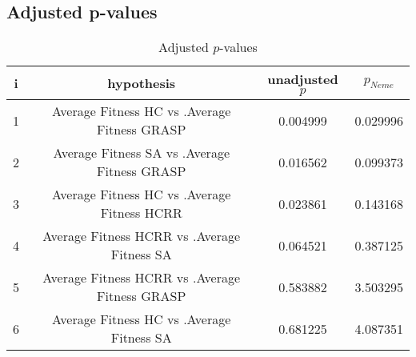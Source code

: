 \documentclass[a4paper,10pt]{article}
\begin{document}
\begin{landscape}
\pagebreak

\subsection{Adjusted p-values}

\begin{table}[!htp]
\centering\scriptsize
\begin{tabular}{cccc}
i&hypothesis&unadjusted $p$&$p_{Neme}$\\
\hline1&Average Fitness HC       vs .Average Fitness GRASP&0.004999&0.029996\\
2&Average Fitness SA      vs .Average Fitness GRASP&0.016562&0.099373\\
3&Average Fitness HC       vs .Average Fitness HCRR   &0.023861&0.143168\\
4&Average Fitness HCRR    vs .Average Fitness SA     &0.064521&0.387125\\
5&Average Fitness HCRR    vs .Average Fitness GRASP&0.583882&3.503295\\
6&Average Fitness HC       vs .Average Fitness SA     &0.681225&4.087351\\
\hline
\end{tabular}
\caption{Adjusted $p$-values}
\end{table}

\end{landscape}
\end{document}
